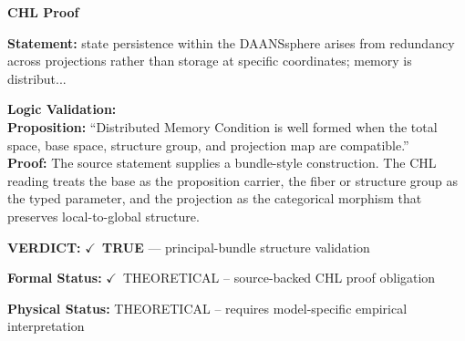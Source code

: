 \vspace{0.45em}
\noindent\textbf{CHL Proof}\par
\textbf{Statement:} state persistence within the DAANSsphere arises from redundancy across projections
rather than storage at specific coordinates; memory is distribut...

\textbf{Logic Validation:}\\
\textbf{Proposition:} ``Distributed Memory Condition is well formed when the total space, base space, structure
group, and projection map are compatible.''\\
\textbf{Proof:} The source statement supplies a bundle-style construction. The CHL reading treats the
base as the proposition carrier, the fiber or structure group as the typed parameter,
and the projection as the categorical morphism that preserves local-to-global structure.

\textbf{VERDICT:} \ensuremath{\checkmark}\ \textbf{TRUE} --- principal-bundle structure validation

\textbf{Formal Status:} \ensuremath{\checkmark}\ THEORETICAL -- source-backed CHL proof obligation

\textbf{Physical Status:} THEORETICAL -- requires model-specific empirical interpretation
\par\vspace{0.45em}
\par
\ifTZPDarkEdition
{}
\fi
\endgroup
\endgroup
